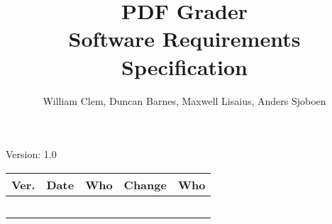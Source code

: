 \documentclass[letterpaper,12pt]{article}
\title{PDF Grader\\Software Requirements Specification}
\author{William Clem, Duncan Barnes, Maxwell Lisaius, Anders Sjoboen}
\begin{document}
\maketitle

\begin{center}
  Version: 1.0
\end{center}

\vfill
\begin{tabularx}{\linewidth}{|l|l|l|X|l|}\hline
Ver. & Date & Who & Change & Who \\\hline
     &      &     &        &     \\\hline
     &      &     &        &     \\\hline
     &      &     &        &     \\\hline
     &      &     &        &     \\\hline
     &      &     &        &     \\\hline
\end{tabularx}

\newpage







\appendix 



\end{document}
